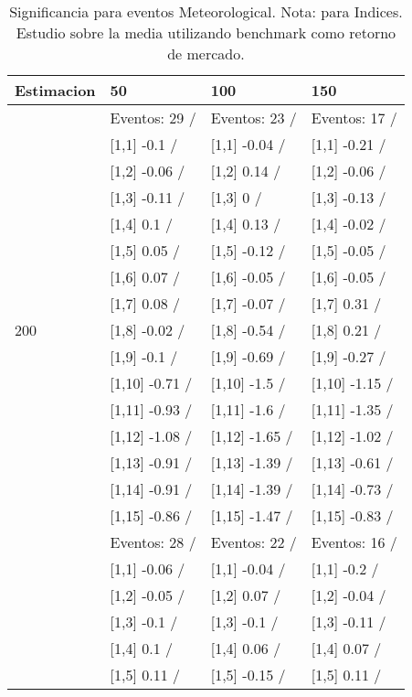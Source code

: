 \begin{table}

\caption{Significancia para eventos Meteorological. Nota: para Indices. Estudio sobre la media utilizando benchmark como retorno de mercado.}
\centering
\begin{tabular}[t]{llll}
\toprule
Estimacion & 50 & 100 & 150\\
\midrule
 & Eventos:  29 / & Eventos:  23 / & Eventos:  17 /\\
 & {}[1,1] -0.1  / & {}[1,1] -0.04  / & {}[1,1] -0.21  /\\
 & {}[1,2] -0.06  / & {}[1,2] 0.14  / & {}[1,2] -0.06  /\\
 & {}[1,3] -0.11  / & {}[1,3] 0  / & {}[1,3] -0.13  /\\
 & {}[1,4] 0.1  / & {}[1,4] 0.13  / & {}[1,4] -0.02  /\\
\addlinespace
 & {}[1,5] 0.05  / & {}[1,5] -0.12  / & {}[1,5] -0.05  /\\
 & {}[1,6] 0.07  / & {}[1,6] -0.05  / & {}[1,6] -0.05  /\\
 & {}[1,7] 0.08  / & {}[1,7] -0.07  / & {}[1,7] 0.31  /\\
200 & {}[1,8] -0.02  / & {}[1,8] -0.54  / & {}[1,8] 0.21  /\\
 & {}[1,9] -0.1  / & {}[1,9] -0.69  / & {}[1,9] -0.27  /\\
\addlinespace
 & {}[1,10] -0.71  / & {}[1,10] -1.5  / & {}[1,10] -1.15  /\\
 & {}[1,11] -0.93  / & {}[1,11] -1.6  / & {}[1,11] -1.35  /\\
 & {}[1,12] -1.08  / & {}[1,12] -1.65  / & {}[1,12] -1.02  /\\
 & {}[1,13] -0.91  / & {}[1,13] -1.39  / & {}[1,13] -0.61  /\\
 & {}[1,14] -0.91  / & {}[1,14] -1.39  / & {}[1,14] -0.73  /\\
\addlinespace
 & {}[1,15] -0.86  / & {}[1,15] -1.47  / & {}[1,15] -0.83  /\\
 & Eventos:  28 / & Eventos:  22 / & Eventos:  16 /\\
 & {}[1,1] -0.06  / & {}[1,1] -0.04  / & {}[1,1] -0.2  /\\
 & {}[1,2] -0.05  / & {}[1,2] 0.07  / & {}[1,2] -0.04  /\\
 & {}[1,3] -0.1  / & {}[1,3] -0.1  / & {}[1,3] -0.11  /\\
\addlinespace
 & {}[1,4] 0.1  / & {}[1,4] 0.06  / & {}[1,4] 0.07  /\\
 & {}[1,5] 0.11  / & {}[1,5] -0.15  / & {}[1,5] 0.11  /\\

\end{tabular}
\end{table}
